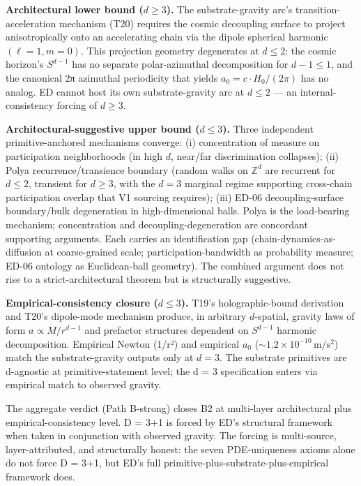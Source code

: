 \documentclass[
  11pt,a4paper]{article}
\begin{document}
\textbf{Architectural lower bound (\(d \ge 3\)).} The substrate-gravity
arc's transition-acceleration mechanism (T20) requires the cosmic
decoupling surface to project anisotropically onto an accelerating chain
via the dipole spherical harmonic \((\ell = 1, m = 0)\). This projection
geometry degenerates at \(d \le 2\): the cosmic horizon's \(S^{d-1}\)
has no separate polar-azimuthal decomposition for \(d - 1 \le 1\), and
the canonical 2π azimuthal periodicity that yields
\(a_0 = c \cdot H_0/(2\pi)\) has no analog. ED cannot host its own
substrate-gravity arc at \(d \le 2\) --- an internal-consistency forcing
of \(d \ge 3\).

\textbf{Architectural-suggestive upper bound (\(d \le 3\)).} Three
independent primitive-anchored mechanisms converge: (i) concentration of
measure on participation neighborhoods (in high \(d\), near/far
discrimination collapses); (ii) Polya recurrence/transience boundary
(random walks on \(\mathbb{Z}^d\) are recurrent for \(d \le 2\),
transient for \(d \ge 3\), with the \(d = 3\) marginal regime supporting
cross-chain participation overlap that V1 sourcing requires); (iii)
ED-06 decoupling-surface boundary/bulk degeneration in high-dimensional
balls. Polya is the load-bearing mechanism; concentration and
decoupling-degeneration are concordant supporting arguments. Each
carries an identification gap (chain-dynamics-as-diffusion at
coarse-grained scale; participation-bandwidth as probability measure;
ED-06 ontology as Euclidean-ball geometry). The combined argument does
not rise to a strict-architectural theorem but is structurally
suggestive.

\textbf{Empirical-consistency closure (\(d \le 3\)).} T19's
holographic-bound derivation and T20's dipole-mode mechanism produce, in
arbitrary \(d\)-spatial, gravity laws of form \(a \propto M/r^{d-1}\)
and prefactor structures dependent on \(S^{d-1}\) harmonic
decomposition. Empirical Newton (1/r²) and empirical \(a_0\)
(\(\sim 1.2 \times 10^{-10}\,\mathrm{m/s^2}\)) match the
substrate-gravity outputs only at \(d = 3\). The substrate primitives
are d-agnostic at primitive-statement level; the d = 3 specification
enters via empirical match to observed gravity.

The aggregate verdict (Path B-strong) closes B2 at multi-layer
architectural plus empirical-consistency level. D = 3+1 is forced by
ED's structural framework when taken in conjunction with observed
gravity. The forcing is multi-source, layer-attributed, and structurally
honest: the seven PDE-uniqueness axioms alone do not force D = 3+1, but
ED's full primitive-plus-substrate-plus-empirical framework does.
\end{document}
